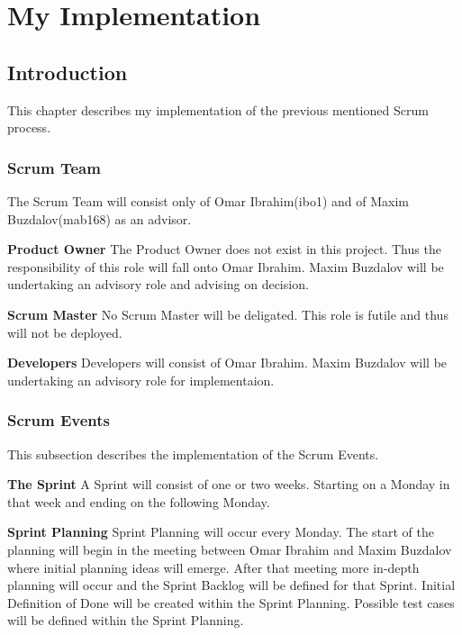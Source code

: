 \chapter{My Implementation}

\section{Introduction}
This chapter describes my implementation of the previous mentioned Scrum process.

\subsection{Scrum Team}
The Scrum Team will consist only of Omar Ibrahim(ibo1) and of Maxim Buzdalov(mab168) as an advisor.\newline

\textbf{Product Owner}\newline
The Product Owner does not exist in this project. Thus the responsibility of this role will fall onto Omar Ibrahim. 
Maxim Buzdalov will be undertaking an advisory role and advising on decision.

\textbf{Scrum Master}\newline
No Scrum Master will be deligated. This role is futile and thus will not be deployed.

\textbf{Developers}\newline
Developers will consist of Omar Ibrahim. Maxim Buzdalov will be undertaking an advisory role for implementaion.


\subsection{Scrum Events}
This subsection describes the implementation of the Scrum Events.\newline

\textbf{The Sprint}\newline
A Sprint will consist of one or two weeks. Starting on a Monday in that week and ending on the following Monday. \newline

\textbf{Sprint Planning}\newline
Sprint Planning will occur every Monday. The start of the planning will begin in the meeting between Omar Ibrahim and 
Maxim Buzdalov where initial planning ideas will emerge. After that meeting more in-depth planning will occur and the 
Sprint Backlog will be defined for that Sprint. Initial Definition of Done will be created within the Sprint Planning.
Possible test cases will be defined within the Sprint Planning.

